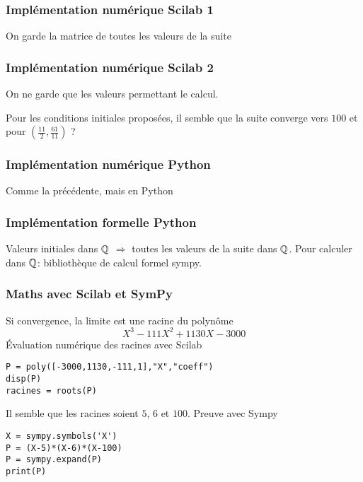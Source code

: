 \begin{frame}
  \frametitle{Implémentation numérique Scilab 1}
On garde la matrice de toutes les valeurs de la suite

\end{frame}

\begin{frame}[fragile]
  \frametitle{Implémentation numérique Scilab 2}
On ne garde que les valeurs permettant le calcul.


Pour les conditions initiales proposées, il semble que la suite converge vers $100$ et pour $(\frac{11}{2},\frac{61}{11})$ ?
\end{frame}

\begin{frame}
  \frametitle{Implémentation numérique Python}
Comme la précédente, mais en Python

\end{frame}

\begin{frame}
  \frametitle{Implémentation formelle Python}
Valeurs initiales dans $\mathbb{Q}$ $\Rightarrow$ toutes les valeurs de la suite dans $\mathbb{Q}$.\newline
Pour calculer dans $\mathbb{Q}$: bibliothèque de calcul formel sympy.

\end{frame}

\begin{frame}[fragile]
  \frametitle{Maths avec Scilab et SymPy}
Si convergence, la limite est une racine du polynôme
\begin{displaymath}
  X^3 - 111X^2+1130X-3000
\end{displaymath}
\'Evaluation numérique des racines avec Scilab
\begin{verbatim}
P = poly([-3000,1130,-111,1],"X","coeff")
disp(P)
racines = roots(P)  
\end{verbatim}
Il semble que les racines soient $5$, $6$ et $100$. Preuve avec Sympy
\begin{verbatim}
X = sympy.symbols('X')
P = (X-5)*(X-6)*(X-100)
P = sympy.expand(P)
print(P)
\end{verbatim}
\end{frame}

